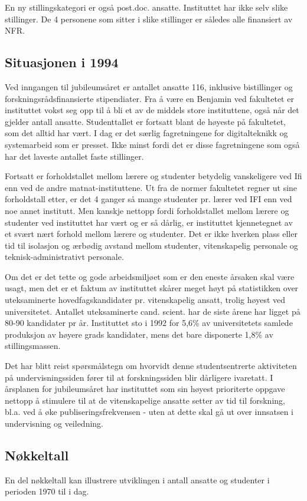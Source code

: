 \documentclass[../main.tex]{subfiles}
\begin{document}
En ny stillingskategori er også post.doc. ansatte. Instituttet har ikke selv slike stillinger. De 4 personene som sitter i slike stillinger er således alle finansiert av NFR.

\subsection{Situasjonen i 1994}
Ved inngangen til jubileumsåret er antallet ansatte 116, inklusive bistillinger og forskningsrådsfinansierte stipendiater. Fra å være en Benjamin ved fakultetet er instituttet vokst seg opp til å bli et av de middels store instituttene, også når det gjelder antall ansatte. Studenttallet er fortsatt blant de høyeste på fakultetet, som det alltid har vært. I dag er det særlig fagretningene for digitalteknikk og systemarbeid som er presset. Ikke minst fordi det er disse fagretningene som også har det laveste antallet faste stillinger.

Fortsatt er forholdstallet mellom lærere og studenter betydelig vanskeligere ved Ifi enn ved de andre matnat-instituttene. Ut fra de normer fakultetet regner ut sine forholdstall etter, er det 4 ganger så mange studenter pr. lærer ved IFI enn ved noe annet institutt. Men kanskje nettopp fordi forholdstallet mellom lærere og studenter ved instituttet har vært og er så dårlig, er instituttet kjennetegnet av et svært nært forhold mellom lærere og studenter. Det er ikke hverken plass eller tid til isolasjon og ærbødig avstand mellom studenter, vitenskapelig personale og teknisk-administrativt personale.

Om det er det tette og gode arbeidsmiljøet som er den eneste årsaken skal være usagt, men det er et faktum av instituttet skårer meget høyt på statistikken over uteksaminerte hovedfagskandidater pr. vitenskapelig ansatt, trolig høyest ved universitetet. Antallet uteksaminerte cand. scient. har de siste årene har ligget på 80-90 kandidater pr år. Instituttet sto i 1992 for 5,6\% av universitetets samlede produksjon av høyere grads kandidater, mens det bare disponerte 1,8\% av stillingsmassen.

Det har blitt reist spørsmålstegn om hvorvidt denne studentsentrerte aktiviteten på undervisningssiden fører til at forskningssiden blir dårligere ivaretatt. I årsplanen for jubileumsåret har instituttet som sin høyest prioriterte oppgave nettopp å stimulere til at de vitenskapelige ansatte setter av tid til forskning, bl.a. ved å øke publiseringsfrekvensen - uten at dette skal gå ut over innsatsen i undervisning og veiledning.

\subsection{Nøkkeltall}
En del nøkkeltall kan illustrere utviklingen i antall ansatte og studenter i perioden 1970 til i dag.

\end{document}
